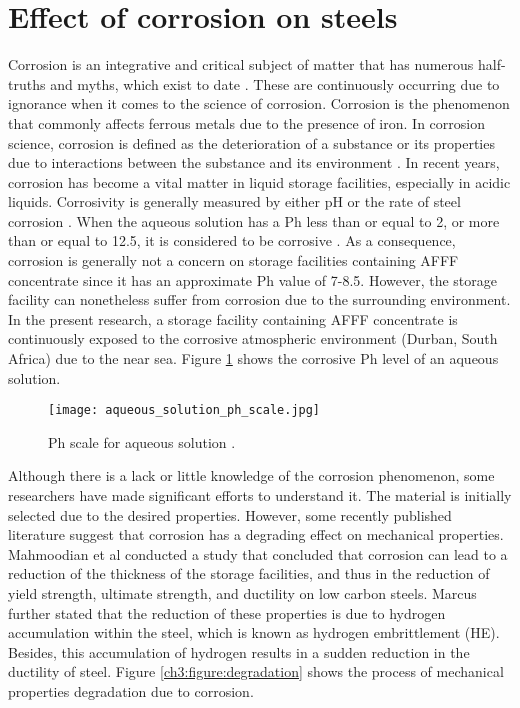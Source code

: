 \section{Effect of corrosion on steels}
Corrosion is an integrative and critical subject of matter that has numerous half-truths and myths, which exist to date \cite{mcarthur2004engineering}. These are continuously occurring due to ignorance when it comes to the science of corrosion.  Corrosion is the phenomenon that commonly affects ferrous metals due to the presence of iron. In corrosion science, corrosion is defined as the deterioration of a substance or its properties due to interactions between the substance and its environment \cite{chigondo2016recent}.
In recent years, corrosion has become a vital matter in liquid storage facilities, especially in acidic liquids. Corrosivity is generally measured by either pH or the rate of steel corrosion \cite{marzorati2018green}. When the aqueous solution has a Ph less than or equal to 2, or more than or equal to 12.5, it is considered to be corrosive \cite{marzorati2018green}. As a consequence, corrosion is generally not a concern on storage facilities containing AFFF concentrate since it has an approximate Ph value of 7-8.5. However, the storage facility can nonetheless suffer from corrosion due to the surrounding environment. In the present research, a storage facility containing AFFF concentrate is continuously exposed to the corrosive atmospheric environment (Durban, South Africa) due to the near sea. Figure \ref{ch3:figure:ph} shows the corrosive Ph level of an aqueous solution. 
 
\begin{figure}[H]
    \centering
    \texttt{[image: aqueous\_solution\_ph\_scale.jpg]}
    \caption{Ph scale for aqueous solution \cite{marzorati2018green}.}
    \label{ch3:figure:ph}
\end{figure}

Although there is a lack or little knowledge of the corrosion phenomenon, some researchers have made significant efforts to understand it. The material is initially selected due to the desired properties. However, some recently published literature suggest that corrosion has a degrading effect on mechanical properties. Mahmoodian et al \cite{li2018effect} conducted a study that concluded that corrosion can lead to a reduction of the thickness of the storage facilities, and thus in the reduction of yield strength, ultimate strength, and ductility on low carbon steels.  Marcus \cite{protopopoff2011surface} further stated that the reduction of these properties is due to hydrogen accumulation within the steel, which is known as hydrogen embrittlement (HE). Besides, this accumulation of hydrogen results in a sudden reduction in the ductility of steel. Figure \ref{ch3:figure:degradation} shows the process of mechanical properties degradation due to corrosion.
 
